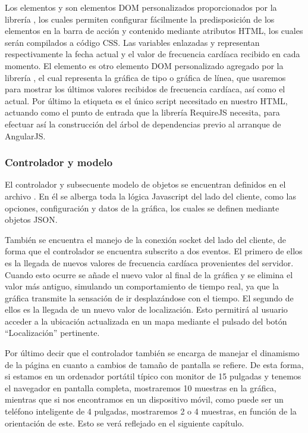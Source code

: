 Los elementos  y  son elementos DOM personalizados proporcionados por la librería , los cuales permiten configurar fácilmente la predisposición de los elementos en la barra de acción y contenido mediante atributos HTML, los cuales serán compilados a código CSS.
Las variables enlazadas  y  representan respectivamente la fecha actual y el valor de frecuencia cardíaca recibido en cada momento.
El elemento  es otro elemento DOM personalizado agregado por la librería , el cual representa la gráfica de tipo  o gráfica de línea, que usaremos para mostrar los últimos valores recibidos de frecuencia cardíaca, así como el actual.
Por último la etiqueta  es el único script necesitado en nuestro HTML, actuando como el punto de entrada que la librería RequireJS necesita, para efectuar así la construcción del árbol de dependencias previo al arranque de AngularJS.

\subsubsection{Controlador y modelo}
El controlador y subsecuente modelo de objetos se encuentran definidos en el archivo . En él se alberga toda la lógica Javascript del lado del cliente, como las opciones, configuración y datos de la gráfica, los cuales se definen mediante objetos JSON.

También se encuentra el manejo de la conexión socket del lado del cliente, de forma que el controlador se encuentra subscrito a dos eventos. El primero de ellos es la llegada de nuevos valores de frecuencia cardíaca provenientes del servidor. Cuando esto ocurre se añade el nuevo valor al final de la gráfica y se elimina el valor más antiguo, simulando un comportamiento de tiempo real, ya que la gráfica transmite la sensación de ir desplazándose con el tiempo. El segundo de ellos es la llegada de un nuevo valor de localización. Esto permitirá al usuario acceder a la ubicación actualizada en un mapa mediante el pulsado del botón ``Localización'' pertinente.

Por último decir que el controlador también se encarga de manejar el dinamismo de la página en cuanto a cambios de tamaño de pantalla se refiere. De esta forma, si estamos en un ordenador portátil típico con monitor de 15 pulgadas y tenemos el navegador en pantalla completa, mostraremos 10 muestras en la gráfica, mientras que si nos encontramos en un dispositivo móvil, como puede ser un teléfono inteligente de 4 pulgadas, mostraremos 2 o 4 muestras, en función de la orientación de este. Esto se verá reflejado en el siguiente capítulo.

\chapterend{}
